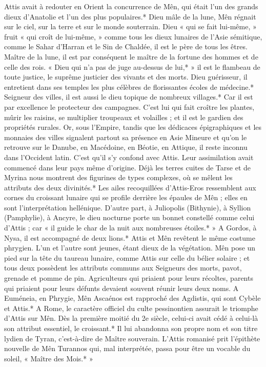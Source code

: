 \documentclass[a4paper, 11pt, oneside, polutonikogreek, french]{article}
\begin{document}
Attis avait à redouter en Orient la concurrence de Mên, qui était l'un des grands dieux d'Anatolie et l'un des plus populaires.* Dieu mâle de la lune, Mên régnait sur le ciel, sur la terre et sur le monde souterrain. Dieu « qui se fait lui-même, » fruit « qui croît de lui-même, » comme tous les dieux lunaires de l'Asie sémitique, comme le Sahar d'Harran et le Sin de Chaldée, il est le père de tous les êtres. Maître de la lune, il est par conséquent le maître de la fortune des hommes et de celle des rois. « Dieu qui n'a pas de juge au-dessus de lui,* » il est le flambeau de toute justice, le suprême justicier des vivants et des morts. Dieu guérisseur, il entretient dans ses temples les plus célèbres de florissantes écoles de médecine.* Seigneur des villes, il est aussi le dieu topique de nombreux villages.* Car il est par excellence le protecteur des campagnes. C'est lui qui fait croître les plantes, mûrir les raisins, se multiplier troupeaux et volailles ; et il est le gardien des propriétés rurales. Or, sous l'Empire, tandis que les dédicaces épigraphiques et les monnaies des villes signalent partout sa présence en Asie Mineure et qu'on le retrouve sur le Danube, en Macédoine, en Béotie, en Attique, il reste inconnu dans l'Occident latin. C'est qu'il s'y confond avec Attis. Leur assimilation avait commencé dans leur pays même d'origine. Déjà les terres cuites de Tarse et de Myrina nous montrent des figurines de types complexes, où se mêlent les attributs des deux divinités.* Les ailes recoquillées d'Attis-Eros ressemblent aux cornes du croissant lunaire qui se profile derrière les épaules de Mên ; elles en sont l'interprétation hellénique. D'autre part, à Juliopolis (Bithynie), à Syllion (Pamphylie), à Ancyre, le dieu nocturne porte un bonnet constellé comme celui d'Attis ; car « il guide le char de la nuit aux nombreuses étoiles.* » A Gordos, à Nysa, il est accompagné de deux lions.* Attis et Mên revêtent le même costume phrygien. L'un et l'autre sont jeunes, étant dieux de la végétation. Mên pose un pied sur la tête du taureau lunaire, comme Attis sur celle du bélier solaire ; et tous deux possèdent les attributs communs aux Seigneurs des morts, pavot, grenade et pomme de pin. Agriculteurs qui priaient pour leurs récoltes, parents qui priaient pour leurs défunts devaient souvent réunir leurs deux noms. A Euméneia, en Phrygie, Mên Ascaénos est rapproché des Agdistis, qui sont Cybèle et Attis.* A Rome, le caractère officiel du culte pessinontien assurait le triomphe d'Attis sur Mên. Dès la première moitié du 2e siècle, celui-ci avait cédé à celui-là son attribut essentiel, le croissant.* Il lui abandonna son propre nom et son titre lydien de Tyran, c'est-à-dire de Maître souverain. L'Attis romanisé prit l'épithète nouvelle de Mên Turannos qui, mal interprétée, passa pour être un vocable du soleil, « Maître des Mois.* »
\end{document}
